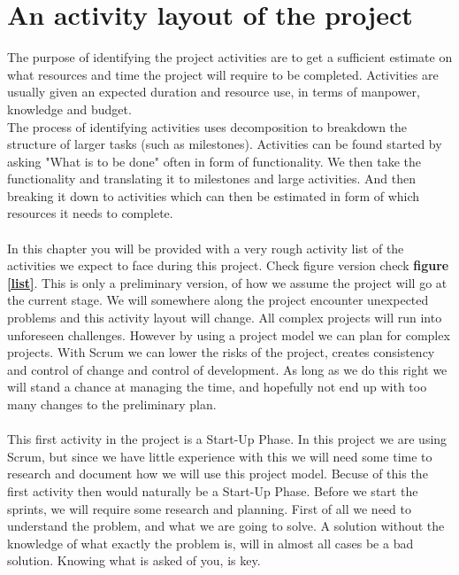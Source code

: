 \section{An activity layout of the project}

The purpose of identifying the project activities are to get a sufficient estimate on what resources and time the project will require to be completed. Activities are usually given an expected duration and resource use, in terms of manpower, knowledge and budget. \\
The process of identifying activities uses decomposition to breakdown the structure of larger tasks (such as milestones). Activities can be found started by asking "What is to be done" often in form of functionality. We then take the functionality and translating it to milestones and large activities. And then breaking it down to activities which can then be estimated in form of which resources it needs to complete. \\
\\
In this chapter you will be provided with a very rough activity list of the activities we expect to face during this project. Check figure version check \textbf{figure \ref{list}}. This is only a preliminary version, of how we assume the project will go at the current stage. We will somewhere along the project encounter unexpected problems and this activity layout will change. All complex projects will run into unforeseen challenges. However by using a project model we can plan for complex projects. With Scrum we can lower the risks of the project, creates consistency and control of change and control of development. As long as we do this right we will stand a chance at managing the time, and hopefully not end up with too many changes to the preliminary plan.\\
\\
This first activity in the project is a Start-Up Phase. In this project we are using Scrum, but since we have little experience with this we will need some time to research and document how we will use this project model. Becuse of this the first activity then would naturally be a Start-Up Phase. Before we start the sprints, we will require some research and planning. First of all we need to understand the problem, and what we are going to solve. A solution without the knowledge of what exactly the problem is, will in almost all cases be a bad solution. Knowing what is asked of you, is key. \\ 
\\
